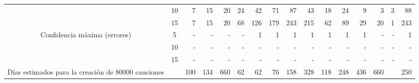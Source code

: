 \begin{sidewaystable}
\begin{tabular}{@{}ccc|rrrrrrrrrrrrrr@{}}
\multicolumn{2}{c}{}                                               & 10 & 7                      & 15                     & 20                     & 24                     & 42                     & 71                     & 87                     & 43                     & 18                     & 24                     & 9                      & 3                      & 3                      & 88                     \\
\multicolumn{2}{c}{}                                               & 15 & 7                      & 15                     & 20                     & 68                     & 126                    & 179                    & 243                    & 215                    & 62                     & 89                     & 29                     & 20                     & 1                      & 243                    \\
\midrule
\multicolumn{2}{c}{\multirow{3}{*}{Confidencia máxima (errores)}}  & 5  & -                      & -                      & -                      & -                      & 1                      & 1                      & 1                      & 1                      & 1                      & 1                      & 1                      & -                      & -                      & 1                      \\
\multicolumn{2}{c}{}                                               & 10 & -                      & -                      & -                      & -                      & -                      & -                      & -                      & -                      & -                      & -                      & -                      & -                      & -                      & -                      \\
\multicolumn{2}{c}{}                                               & 15 & -                      & -                      & -                      & -                      & -                      & -                      & -                      & -                      & -                      & -                      & -                      & -                      & -                      & -                      \\
\midrule
\multicolumn{2}{c}{Días estimados para la creación de 80000 canciones}         &    & 100                    & 134                    & 660                    & 62                     & 62                     & 76                     & 158                    & 328                    & 118                    & 248                    & 436                    & 660                    &                        & 250                    \\ \midrule \bottomrule
\end{tabular}
\end{sidewaystable}






